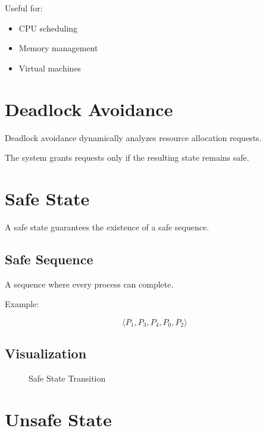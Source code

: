 Useful for:

\begin{itemize}
\item CPU scheduling
\item Memory management
\item Virtual machines
\end{itemize}

\section{Deadlock Avoidance}

Deadlock avoidance dynamically analyzes resource allocation requests.

The system grants requests only if the resulting state remains safe.

\section{Safe State}

A safe state guarantees the existence of a safe sequence.

\subsection{Safe Sequence}

A sequence where every process can complete.

Example:

\[
\langle P_1,P_3,P_4,P_0,P_2 \rangle
\]

\subsection{Visualization}

\begin{figure}[H]
\centering
{}
\caption{Safe State Transition}
\end{figure}

\section{Unsafe State}

